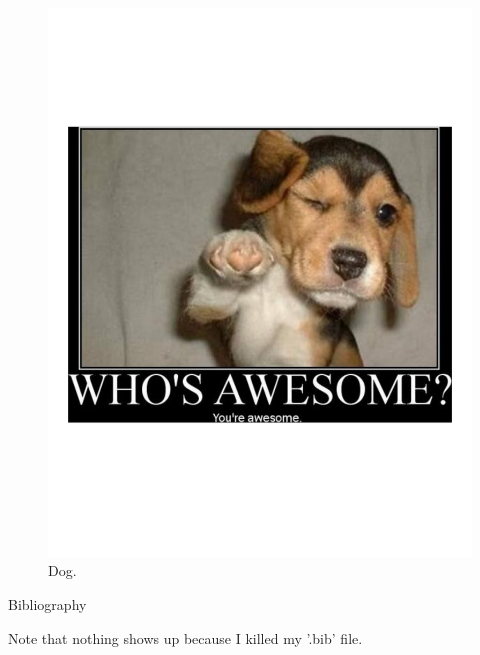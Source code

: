 \documentclass[final]{beamer}
\begin{document}
\begin{frame}[plain]{}
\begin{center}
\begin{minipage}[t]{.23\linewidth}
\begin{figure}
	    \includegraphics[width=\textwidth, trim=0 150 0 150, clip]{./figs/whoisawesome} \vspace*{-2.0cm}
	    \caption{\normalsize Dog.}
	    \label{fig:Elasticity}
	  \end{figure}
		\begin{minipage}{\linewidth}
	  \begin{block}{\footnotesize Bibliography}
	    
	    
{\footnotesize	    Note that nothing shows up because I killed my '.bib' file.}
	  \end{block}
	\end{minipage} 
      \end{minipage}\hspace{1.25cm}
%
%
%
	\begin{minipage}[t]{.23\linewidth}


\end{minipage}
\end{center}
\end{frame}
\end{document}
